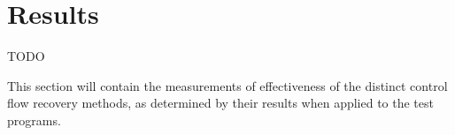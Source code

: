 
\section{Results}

TODO

This section will contain the measurements of effectiveness of the distinct control flow recovery methods, as determined by their results when applied to the test programs.
